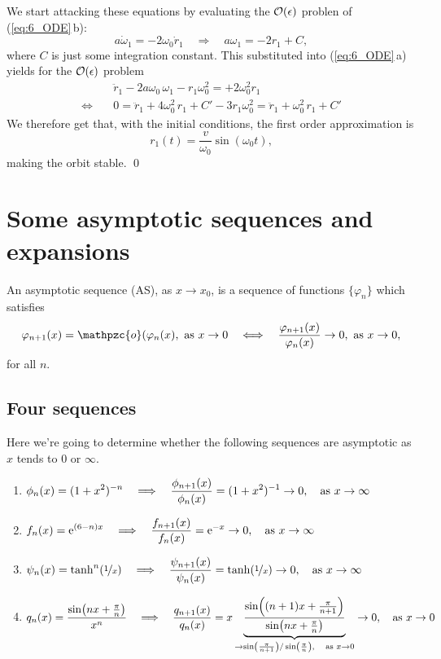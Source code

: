 \documentclass[11pt,letter, swedish, english
]{article}
\newcommand{\oh}{\ensuremath\mathpzc{o}}
\begin{document}
We start attacking these equations by evaluating the
$\order{\epsilon}$ problen of (\ref{eq:6_ODE}\,b):
\begin{equation}
a\dot{\omega}_1=-2\omega_0\dot{r}_1 \quad\Longrightarrow\quad
a\omega_1 = -2r_1 + C,
\end{equation}
where $C$ is just some integration constant. This substituted into 
(\ref{eq:6_ODE}\,a) yields for the $\order{\epsilon}$
problem\footnotemark{} 
\begin{equation}
\begin{aligned}
&\ddot{r}_1 - 2a\omega_0\,\omega_1 - r_1\omega_0^2 = +2\omega_0^2r_1\\
\Longleftrightarrow\quad&
0=\ddot{r}_1 + 4\omega_0^2\,r_1 +C' - 3r_1\omega_0^2 = \ddot{r}_1 +
\omega_0^2\,r_1 +C'
\end{aligned}
\end{equation}
We therefore get that, with the initial conditions, the first order
approximation is
\begin{equation}
r_1(t) = \frac{v}{\omega_0}\sin(\omega_0t),
\end{equation}
making the orbit stable.
\qed
{}


\section{Some asymptotic sequences and expansions}
An asymptotic sequence (AS), as $x\to x_0$, is a sequence of functions
$\{\varphi_n\}$ which satisfies
\begin{equation}
\varphi_{n+1}(x) = \oh(\varphi_{n}(x), \text{ as } x\to0
\quad\Longleftrightarrow\quad
\frac{\varphi_{n+1}(x)}{\varphi_{n}(x)}\to0 , \text{ as } x\to0,
\end{equation}
for all $n$.
\subsection{Four sequences}
\newcommand{\as}{\qcomma\text{as }}
Here we're going to determine whether the following sequences are
asymptotic as $x$ tends to $0$ or $\infty$.

\begin{enumerate}[label=(\roman*)]
\item $\displaystyle \phi_n(x)=(1+x^2)^{-n} \quad\Longrightarrow\quad
\frac{\phi_{n+1}(x)}{\phi_{n}(x)}=(1+x^2)^{-1}\to0\as x\to\infty$
\item $\displaystyle f_n(x)=\ee^{(6-n)x} \quad\Longrightarrow\quad
\frac{f_{n+1}(x)}{f_{n}(x)}=\ee^{-x}\to0\as x\to\infty$
\item $\displaystyle \psi_n(x)=\tanh^n(\nicefrac{1}{x}) \quad\Longrightarrow\quad
\frac{\psi_{n+1}(x)}{\psi_{n}(x)}=\tanh(\nicefrac{1}{x})\to0\as
x\to\infty$
\item $\displaystyle q_n(x)=\frac{\sin(nx+\frac{\pi}{n})}{x^n} \quad\Longrightarrow\quad
\frac{q_{n+1}(x)}{q_{n}(x)}=
x\underbrace{\frac{\sin((n+1)x+\frac{\pi}{n+1})}
{\sin(nx+\frac{\pi}{n})}}_{\to
\sin(\frac{\pi}{n+1})/\sin(\frac{\pi}{n})\as x\to0 }
\to0\as x\to0$
\end{enumerate}
\end{document}
